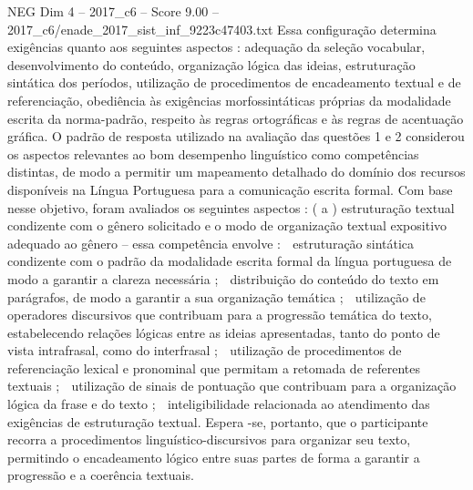 \begin{textsample}{NEG Dim 4 – 2017\_c6 – Score 9.00 – 2017\_c6/enade\_2017\_sist\_inf\_9223c47403.txt}
Essa configuração determina exigências quanto aos seguintes aspectos : adequação da seleção vocabular, desenvolvimento do conteúdo, organização lógica das ideias, estruturação sintática dos períodos, utilização de procedimentos de encadeamento textual e de referenciação, obediência às exigências morfossintáticas próprias da modalidade escrita da norma-padrão, respeito às regras ortográficas e às regras de acentuação gráfica.
O padrão de resposta utilizado na avaliação das questões 1 e 2 considerou os aspectos relevantes ao bom desempenho linguístico como competências distintas, de modo a permitir um mapeamento detalhado do domínio dos recursos disponíveis na Língua Portuguesa para a comunicação escrita formal.
Com base nesse objetivo, foram avaliados os seguintes aspectos : ( a ) estruturação textual condizente com o gênero solicitado e o modo de organização textual expositivo adequado ao gênero – essa competência envolve :  estruturação sintática condizente com o padrão da modalidade escrita formal da língua portuguesa de modo a garantir a clareza necessária ;  distribuição do conteúdo do texto em parágrafos, de modo a garantir a sua organização temática ;  utilização de operadores discursivos que contribuam para a progressão temática do texto, estabelecendo relações lógicas entre as ideias apresentadas, tanto do ponto de vista intrafrasal, como do interfrasal ;  utilização de procedimentos de referenciação lexical e pronominal que permitam a retomada de referentes textuais ;  utilização de sinais de pontuação que contribuam para a organização lógica da frase e do texto ;  inteligibilidade relacionada ao atendimento das exigências de estruturação textual.
Espera -se, portanto, que o participante recorra a procedimentos linguístico-discursivos para organizar seu texto, permitindo o encadeamento lógico entre suas partes de forma a garantir a progressão e a coerência textuais.

\end{textsample}
